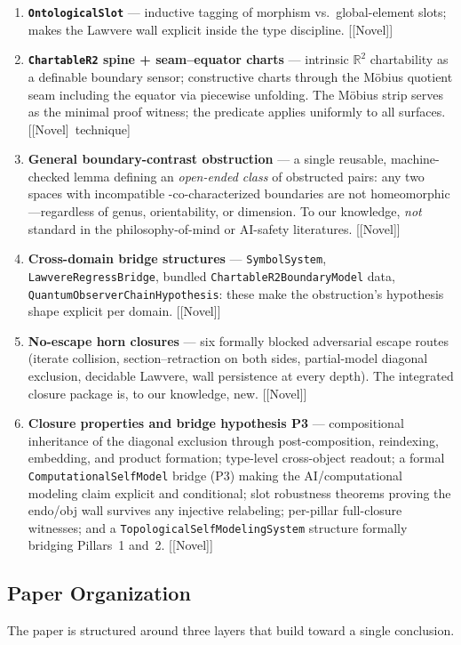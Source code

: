\documentclass[11pt]{article}
\newcommand{\novel}{\textcolor{blue!70!black}{[Novel]}}
\begin{document}
\begin{enumerate}[label=(\arabic*),itemsep=0.4ex]
\item \textbf{\texttt{OntologicalSlot}} --- inductive tagging of morphism
  vs.\ global-element slots; makes the Lawvere wall explicit inside the
  type discipline. [\novel]
\item \textbf{\texttt{ChartableR2} spine + seam--equator charts} ---
  intrinsic $\mathbb{R}^2$ chartability as a definable boundary sensor;
  constructive charts through the M\"obius quotient seam including the
  equator via piecewise unfolding.  The M\"obius strip serves as the
  minimal proof witness; the predicate applies uniformly to all
  surfaces. [\novel\ technique]
\item \textbf{General boundary-contrast obstruction} ---
  a single reusable, machine-checked lemma defining an
  \emph{open-ended class} of obstructed pairs: any two spaces
  with incompatible -co-characterized
  boundaries are not homeomorphic---regardless of genus,
  orientability, or dimension.  To our knowledge, \emph{not}
  standard in the philosophy-of-mind or AI-safety
  literatures. [\novel]
\item \textbf{Cross-domain bridge structures} ---
  \texttt{SymbolSystem}, \texttt{LawvereRegressBridge},
  bundled \texttt{ChartableR2BoundaryModel} data,
  \texttt{QuantumObserverChainHypothesis}: these make the obstruction's
  hypothesis shape explicit per domain. [\novel]
\item \textbf{No-escape horn closures} --- six formally blocked
  adversarial escape routes (iterate collision, section--retraction on
  both sides, partial-model diagonal exclusion, decidable Lawvere,
  wall persistence at every depth).  The integrated closure package is,
  to our knowledge, new. [\novel]
\item \textbf{Closure properties and bridge hypothesis P3} ---
  compositional inheritance of the diagonal exclusion through
  post-composition, reindexing, embedding, and product formation;
  type-level cross-object readout; a formal \texttt{ComputationalSelfModel}
  bridge (P3) making the AI/computational modeling claim explicit and
  conditional; slot robustness theorems proving the endo/obj wall
  survives any injective relabeling; per-pillar full-closure witnesses;
  and a \texttt{TopologicalSelfModelingSystem} structure formally
  bridging Pillars~1 and~2. [\novel]
\end{enumerate}

\subsection{Paper Organization}
The paper is structured around three layers that build toward a single
conclusion.
\end{document}
